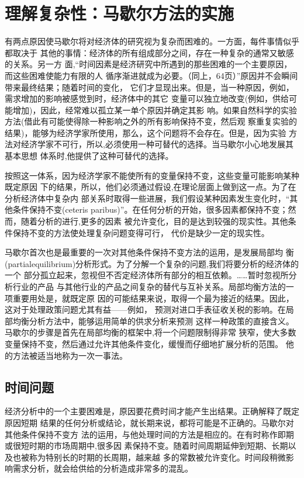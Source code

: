 \section{理解复杂性：马歇尔方法的实施}

有两点原因使马歇尔将对经济体的研究视为复杂而困难的。一方面，每件事情似乎都取决于
其他的事情：经济体的所有组成部分之间，存在一种复杂的通常又敏感的关系。另一方
面,“时间因素是经济研究中所遇到的那些困难的一个主要原因，而这些困难使能力有限的人
循序渐进就成为必要。（同上，64页）”原因并不会瞬间带来最终结果；随着时间的变化，
它们才显现出来。但是，当一种原因，例如，需求增加的影响被感觉到时，经济体中的其它
变量可以独立地改变(例如，供给可能增加)，因此，经常难以孤立某一单个原因并确定其影
响。如果自然科学的实验方法(借此有可能使得除一种影响之外的所有影响保持不变，然后观
察重复实验的结果)，能够为经济学家所使用，那么，这个问题将不会存在。但是，因为实验
方法对经济学家不可行，所以,必须使用一种可替代的选择。当马歇尔小心地发展其基本思想
体系时,他提供了这种可替代的选择。

按照这一体系，因为经济学家不能使所有的变量保持不变，这些变量可能影响某种既定原因
下的结果，所以，他们必须通过假设,在理论层面上做到这一点。为了在分析经济体中复杂内
部关系时取得一些进展，我们假设某种因素发生变化时，“其他条件保持不变(ceteris
paribus)”。在任何分析的开始，很多因素都保持不变；然而，随着分析的进行,更多的因素
被允许变化，目的是达到较强的现实性。其他条件保持不变的方法使处理复杂问题变得可行，
代价是缺少一定的现实性。

马歇尔首次也是最重要的一次对其他条件保持不变方法的运用，是发展局部均
衡(partialequilibrium)分析形式。为了分解一个复杂的问题,我们将要分析的经济体的一个
部分孤立起来，忽视但不否定经济体所有部分的相互依赖。……暂时忽视所分析行业的产品
与其他行业的产品之间复杂的替代与互补关系。局部均衡方法的一项重要用处是，就既定原
因的可能结果来说，取得一个最为接近的结果。因此，这对于处理政策问题尤其有益——例如，
预测对进口手表征收关税的影响。在局部均衡分析方法中，能够运用简单的供求分析来预测
这样一种政策的直接含义。马歇尔的步骤是首先在局部均衡的框架中,将一个问题限制得非常
狭窄，使大多数变量保持不变，然后通过允许其他条件变化，缓慢而仔细地扩展分析的范围。
他的方法被适当地称为一次一事法。

\subsection{时间问题}

经济分析中的一个主要困难是，原因要花费时间才能产生出结果。正确解释了既定原因短期
结果的任何分析或结论，就长期来说，都将可能是不正确的。马歇尔对其他条件保持不变方
法的运用，与他处理时间的方法是相应的。在有时称作即期或很短时期的市场周期中,很多因
素保持不变。随着时间周期延伸到短期、长期以及也被称为特别长的时期的长周期，越来越
多的常数被允许变化。时间段稍微影响需求分析，就会给供给的分析造成非常多的混乱。

